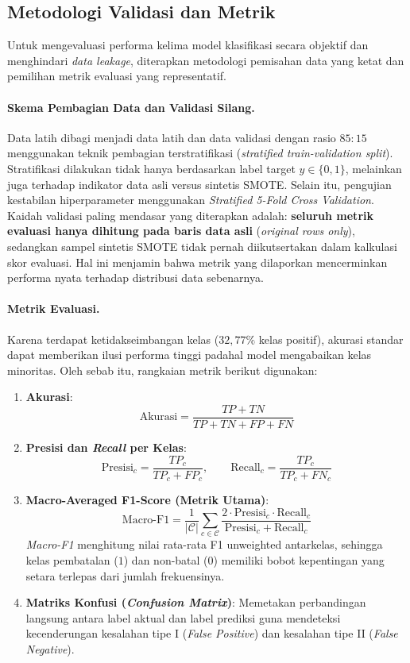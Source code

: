 \subsection{Metodologi Validasi dan Metrik}

Untuk mengevaluasi performa kelima model klasifikasi secara objektif dan menghindari \textit{data leakage},
diterapkan metodologi pemisahan data yang ketat dan pemilihan metrik evaluasi yang representatif.

\paragraph{Skema Pembagian Data dan Validasi Silang.}
Data latih dibagi menjadi data latih dan data validasi dengan rasio $85:15$ menggunakan teknik
pembagian terstratifikasi (\textit{stratified train-validation split}). Stratifikasi dilakukan tidak hanya
berdasarkan label target $y \in \{0, 1\}$, melainkan juga terhadap indikator data asli versus sintetis SMOTE.
Selain itu, pengujian kestabilan hiperparameter menggunakan \textit{Stratified 5-Fold Cross Validation}.
Kaidah validasi paling mendasar yang diterapkan adalah: \textbf{seluruh metrik evaluasi hanya dihitung pada baris
data asli} (\textit{original rows only}), sedangkan sampel sintetis SMOTE tidak pernah diikutsertakan dalam kalkulasi
skor evaluasi. Hal ini menjamin bahwa metrik yang dilaporkan mencerminkan performa nyata terhadap distribusi data sebenarnya.

\paragraph{Metrik Evaluasi.}
Karena terdapat ketidakseimbangan kelas ($32{,}77\%$ kelas positif), akurasi standar dapat memberikan
ilusi performa tinggi padahal model mengabaikan kelas minoritas. Oleh sebab itu, rangkaian metrik berikut digunakan:
\begin{enumerate}
  \item \textbf{Akurasi}:
        \[
        \text{Akurasi} = \frac{TP + TN}{TP + TN + FP + FN}
        \]
  \item \textbf{Presisi dan \textit{Recall} per Kelas}:
        \[
        \text{Presisi}_c = \frac{TP_c}{TP_c + FP_c}, \qquad \text{Recall}_c = \frac{TP_c}{TP_c + FN_c}
        \]
  \item \textbf{Macro-Averaged F1-Score (Metrik Utama)}:
        \[
        \text{Macro-F1} = \frac{1}{|\mathcal{C}|} \sum_{c \in \mathcal{C}} \frac{2 \cdot \text{Presisi}_c \cdot \text{Recall}_c}{\text{Presisi}_c + \text{Recall}_c}
        \]
        \textit{Macro-F1} menghitung nilai rata-rata F1 unweighted antarkelas, sehingga kelas pembatalan ($1$)
        dan non-batal ($0$) memiliki bobot kepentingan yang setara terlepas dari jumlah frekuensinya.
  \item \textbf{Matriks Konfusi (\textit{Confusion Matrix})}:
        Memetakan perbandingan langsung antara label aktual dan label prediksi guna mendeteksi kecenderungan
        kesalahan tipe I (\textit{False Positive}) dan kesalahan tipe II (\textit{False Negative}).
\end{enumerate}

